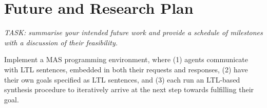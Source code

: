 \documentclass[conference]{IEEEtran}
\begin{document}

\section{Future and Research Plan}

\emph{TASK: summarise your intended future work and provide a schedule
of milestones with a discussion of their feasibility.}

Implement a MAS programming environment, where (1) agents communicate
with LTL sentences, embedded in both their requests and responses, (2)
have their own goals specified as LTL sentences, and (3) each run an
LTL-based synthesis procedure to iteratively arrive at the next step
towards fulfilling their goal.



\end{document}
